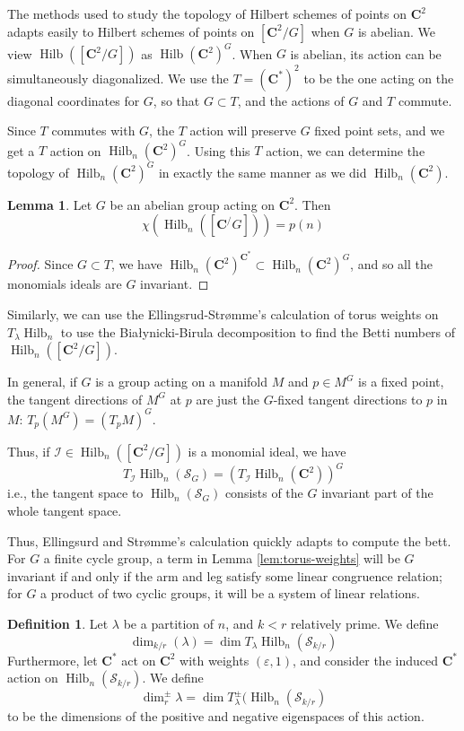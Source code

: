 \documentclass{amsart}[12pt]
\theoremstyle{definition}
\newtheorem{lemma}[dummy]{Lemma}
\newtheorem{definition}[dummy]{Definition}
\newcommand{\C}{\mathbf{C}}
\newcommand{\II}{\mathcal{I}}
\newcommand{\Sur}{\mathcal{S}}
\DeclareMathOperator{\Hilb}{Hilb}
\begin{document}
The methods used to study the topology of Hilbert schemes of points on $\C^2$ adapts easily to Hilbert schemes of points on $[\C^2/G]$ when $G$ is abelian.  We view $\Hilb([\C^2/G])$ as $\Hilb(\C^2)^G$.  When $G$ is abelian, its action can be simultaneously diagonalized.  We use the $T=(\C^*)^2$ to be the one acting on the diagonal coordinates for $G$, so that $G\subset T$, and the actions of $G$ and $T$ commute. 

Since $T$ commutes with $G$, the $T$ action will preserve $G$ fixed point sets, and we get a $T$ action on $\Hilb_n(\C^2)^G$.  Using this $T$ action, we can determine the topology of $\Hilb_n(\C^2)^G$ in exactly the same manner as we did $\Hilb_n(\C^2)$.



\begin{lemma} Let $G$ be an abelian group acting on $\C^2$.  Then
\[ \chi( \Hilb_n([\C^/G]))=p(n) \]
\end{lemma}

\begin{proof}
Since $G\subset T$, we have $\Hilb_n(\C^2)^{\C^*}\subset\Hilb_n(\C^2)^G$, and so all the monomials ideals are $G$ invariant.  
\end{proof}

Similarly, we can use the Ellingsrud-Str\o mme's calculation of torus weights on $T_\lambda\Hilb_n$ to use the Bia\l ynicki-Birula decomposition to find the Betti numbers of $\Hilb_n([\C^2/G])$.  

In general, if $G$ is a group acting on a manifold $M$ and $p\in M^G$ is a fixed point, the tangent directions of $M^G$ at $p$ are just the $G$-fixed tangent directions to $p$ in $M$: $T_p(M^G)=(T_pM)^G$.  

Thus, if $\II\in \Hilb_n([\C^2/G])$ is a monomial ideal, we have
$$T_{\II}\Hilb_n(\Sur_G)=\left(T_{\II}\Hilb_n(\C^2)\right)^G$$
i.e., the tangent space to $\Hilb_n(\Sur_G)$ consists of the $G$ invariant part of the whole tangent space.

Thus, Ellingsurd and Str\o mme's calculation quickly adapts to compute the bett.  For $G$ a finite cycle group, a term in Lemma \ref{lem:torus-weights} will be $G$ invariant if and only if the arm and leg satisfy some linear congruence relation; for $G$ a product of two cyclic groups, it will be a system of linear relations.


\begin{definition}
Let $\lambda$ be a partition of $n$, and $k<r$ relatively prime.  We define 
\[\dim_{k/r}(\lambda)=\dim T_\lambda\Hilb_n(\Sur_{k/r})\]
Furthermore, let $\C^*$ act on $\C^2$ with weights $(\varepsilon, 1)$, and consider the induced $\C^*$ action on $\Hilb_n(\Sur_{k/r})$.  We define 
\[\dim^{\pm}_r \lambda =\dim T^\pm_\lambda(\Hilb_n(\Sur_{k/r})\]
to be the dimensions of the positive and negative eigenspaces of this action. 
\end{definition}
\end{document}

